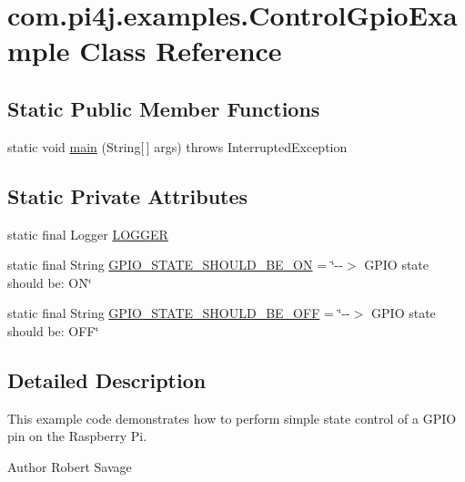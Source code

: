 \hypertarget{classcom_1_1pi4j_1_1examples_1_1ControlGpioExample}{}\section{com.\+pi4j.\+examples.\+Control\+Gpio\+Example Class Reference}
\label{classcom_1_1pi4j_1_1examples_1_1ControlGpioExample}
\subsection*{Static Public Member Functions}
\begin{DoxyCompactItemize}
\item 
static void \hyperlink{classcom_1_1pi4j_1_1examples_1_1ControlGpioExample_a924319c4235f8976252766a43e849dcc}{main} (String\mbox{[}$\,$\mbox{]} args)  throws Interrupted\+Exception 
\end{DoxyCompactItemize}
\subsection*{Static Private Attributes}
\begin{DoxyCompactItemize}
\item 
static final Logger \hyperlink{classcom_1_1pi4j_1_1examples_1_1ControlGpioExample_ac666eb8867a23cf072b3f5c05e9bb061}{L\+O\+G\+G\+E\+R}
\item 
static final String \hyperlink{classcom_1_1pi4j_1_1examples_1_1ControlGpioExample_aa4cacfc43dedb8d8b9e1c6bc1fec882f}{G\+P\+I\+O\+\_\+\+S\+T\+A\+T\+E\+\_\+\+S\+H\+O\+U\+L\+D\+\_\+\+B\+E\+\_\+\+O\+N} = \char`\"{}-\/-\/$>$ G\+P\+I\+O state should be\+: O\+N\char`\"{}
\item 
static final String \hyperlink{classcom_1_1pi4j_1_1examples_1_1ControlGpioExample_acaeee22e7f3420a61219aa5b3220b670}{G\+P\+I\+O\+\_\+\+S\+T\+A\+T\+E\+\_\+\+S\+H\+O\+U\+L\+D\+\_\+\+B\+E\+\_\+\+O\+F\+F} = \char`\"{}-\/-\/$>$ G\+P\+I\+O state should be\+: O\+F\+F\char`\"{}
\end{DoxyCompactItemize}


\subsection{Detailed Description}
This example code demonstrates how to perform simple state control of a G\+P\+I\+O pin on the Raspberry Pi.

\begin{DoxyAuthor}{Author}
Robert Savage 
\end{DoxyAuthor}


